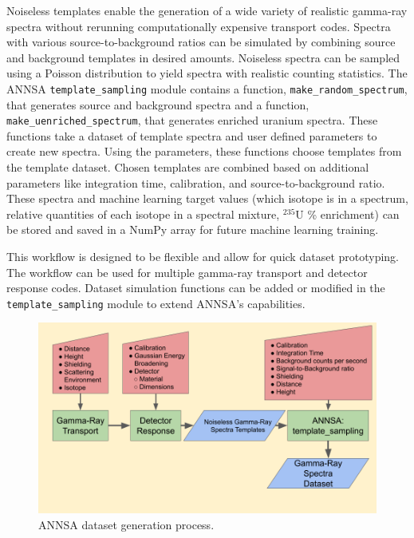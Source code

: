 Noiseless templates enable the generation of a wide variety of realistic gamma-ray spectra without rerunning computationally expensive transport codes. Spectra with various source-to-background ratios can be simulated by combining source and background templates in desired amounts. Noiseless spectra can be sampled using a Poisson distribution to yield spectra with realistic counting statistics. The ANNSA \verb|template_sampling| module contains a function, \verb|make_random_spectrum|, that generates source and background spectra and a function, \verb|make_uenriched_spectrum|, that generates enriched uranium spectra. These functions take a dataset of template spectra and user defined parameters to create new spectra. Using the parameters, these functions choose templates from the template dataset. Chosen templates are combined based on additional parameters like integration time, calibration, and source-to-background ratio. These spectra and machine learning target values (which isotope is in a spectrum, relative quantities of each isotope in a spectral mixture, $^{235}$U \% enrichment) can be stored and saved in a NumPy array for future machine learning training.

This workflow is designed to be flexible and allow for quick dataset prototyping. The workflow can be used for multiple gamma-ray transport and detector response codes. Dataset simulation functions can be added or modified in the \verb|template_sampling| module to extend ANNSA's capabilities.


\begin{figure}[H]
\centering
\includegraphics[trim=40 50 10 0,clip,width=1.0\linewidth]{images/annsa_data_generation.png}
\caption{ANNSA dataset generation process.}
\label{fig:annsa_data_generation}
\end{figure}

